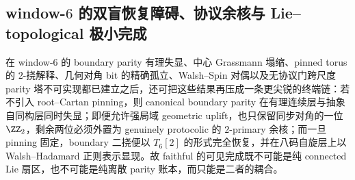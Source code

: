 \subsection{window-\texorpdfstring{$6$}{6} 的双盲恢复障碍、协议余核与 Lie--topological 极小完成}\label{subsec:conclusion-window6-doubleblind-pinning-protocol-walsh-hybrid-completion}

在 window-\(6\) 的 boundary parity 有理失显、中心 Grassmann 塌缩、pinned torus 的 \(2\)-挠解释、几何对角 bit 的精确孤立、Walsh--Spin 对偶以及无协议门跨尺度 parity 塔不可实现都已建立之后，还可把这些结果再压成一条更尖锐的终端链：若不引入 root--Cartan pinning，则 canonical boundary parity 在有理连续层与抽象自同构层同时失显；即便允许强局域 geometric uplift，也只保留同步对角的一位 \(\ZZ_2\)，剩余两位必须外置为 genuinely protocolic 的 \(2\)-primary 余核；而一旦 pinning 固定，boundary 二挠便以 \(T_6[2]\) 的形式完全恢复，并在八码自旋层上以 Walsh--Hadamard 正则表示显现。故 faithful 的可见完成既不可能是纯 connected Lie 扇区，也不可能是纯离散 parity 账本，而只能是二者的耦合。

